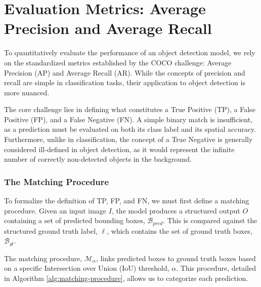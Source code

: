 \section{Evaluation Metrics: Average Precision and Average Recall}
\label{sec:eval_metrics}
 
To quantitatively evaluate the performance of an object detection model, we rely on the standardized metrics established by the COCO challenge: Average Precision (AP) and Average Recall (AR). While the concepts of precision and recall are simple in classification tasks, their application to object detection is more nuanced.

The core challenge lies in defining what constitutes a True Positive (TP), a False Positive (FP), and a False Negative (FN). A simple binary match is insufficient, as a prediction must be evaluated on both its class label and its spatial accuracy. Furthermore, unlike in classification, the concept of a True Negative is generally considered ill-defined in object detection, as it would represent the infinite number of correctly non-detected objects in the background.

\subsubsection{The Matching Procedure}
To formalize the definition of TP, FP, and FN, we must first define a matching procedure. Given an input image $I$, the model produces a structured output $O$ containing a set of predicted bounding boxes, $\mathcal{B}_{pred}$. This is compared against the structured ground truth label, $\ell$, which contains the set of ground truth boxes, $\mathcal{B}_{gt}$.

The matching procedure, $\mathcal{M}_{\alpha}$, links predicted boxes to ground truth boxes based on a specific Intersection over Union (IoU) threshold, $\alpha$. This procedure, detailed in Algorithm \ref{alg:matching-procedure}, allows us to categorize each prediction.
 
